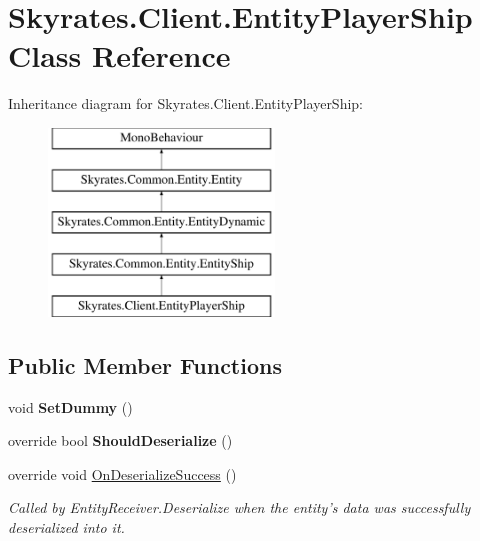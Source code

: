 \hypertarget{class_skyrates_1_1_client_1_1_entity_player_ship}{\section{Skyrates.\-Client.\-Entity\-Player\-Ship Class Reference}
\label{class_skyrates_1_1_client_1_1_entity_player_ship}
}
Inheritance diagram for Skyrates.\-Client.\-Entity\-Player\-Ship\-:\begin{figure}[H]
\begin{center}
\leavevmode
\includegraphics[height=5.000000cm]{class_skyrates_1_1_client_1_1_entity_player_ship}
\end{center}
\end{figure}
\subsection*{Public Member Functions}
\begin{DoxyCompactItemize}
\item 
\hypertarget{class_skyrates_1_1_client_1_1_entity_player_ship_a07c9178e033dfc799ae25af543029c12}{void {\bfseries Set\-Dummy} ()}\label{class_skyrates_1_1_client_1_1_entity_player_ship_a07c9178e033dfc799ae25af543029c12}

\item 
\hypertarget{class_skyrates_1_1_client_1_1_entity_player_ship_a1d9463f5a6af5211c086a2b8c0a7e920}{override bool {\bfseries Should\-Deserialize} ()}\label{class_skyrates_1_1_client_1_1_entity_player_ship_a1d9463f5a6af5211c086a2b8c0a7e920}

\item 
override void \hyperlink{class_skyrates_1_1_client_1_1_entity_player_ship_ab7106388ce039e10be38c27906372312}{On\-Deserialize\-Success} ()
\begin{DoxyCompactList}\small\item\em Called by Entity\-Receiver.\-Deserialize when the entity's data was successfully deserialized into it. \end{DoxyCompactList}\end{DoxyCompactItemize}
